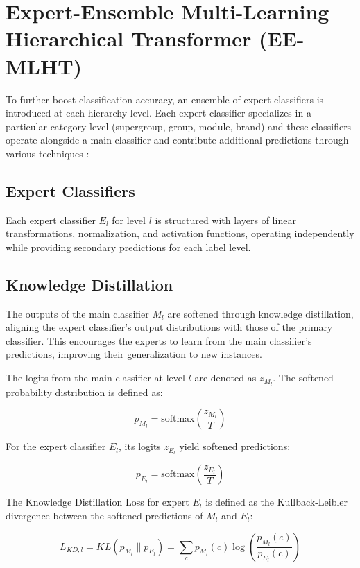 \documentclass[9pt,a4paper,twoside]{rho-class/rho}
\begin{document}
\section{Expert-Ensemble Multi-Learning Hierarchical Transformer (EE-MLHT)}

To further boost classification accuracy, an ensemble of expert classifiers is introduced at each hierarchy level. Each expert classifier specializes in a particular category level (supergroup, group, module, brand) and these classifiers operate alongside a main classifier and contribute additional predictions through various techniques \cite{park2019feed}:

 \subsection{Expert Classifiers}
    
        Each expert classifier \( E_l \) for level \( l \) is structured with layers of linear transformations, normalization, and activation functions, operating independently while providing secondary predictions for each label level.

 \subsection{Knowledge Distillation}
    
        The outputs of the main classifier \( M_l \) are softened through knowledge distillation, aligning the expert classifier’s output distributions with those of the primary classifier. This encourages the experts to learn from the main classifier’s predictions, improving their generalization to new instances. 

   The logits from the main classifier at level \( l \) are denoted as \( z_{M_l} \). The softened probability distribution is defined as:

   \[
   p_{M_l} = \text{softmax}\left(\frac{z_{M_l}}{T}\right)
   \]

   For the expert classifier \( E_l \), its logits \( z_{E_l} \) yield softened predictions:

   \[
   p_{E_l} = \text{softmax}\left(\frac{z_{E_l}}{T}\right)
   \]

   The Knowledge Distillation Loss for expert \( E_l \) is defined as the Kullback-Leibler divergence between the softened predictions of \( M_l \) and \( E_l \):

   \[
   L_{KD,l} = KL\left(p_{M_l} \| p_{E_l}\right) = \sum_{c} p_{M_l}(c) \log\left(\frac{p_{M_l}(c)}{p_{E_l}(c)}\right)
   \]
\end{document}
